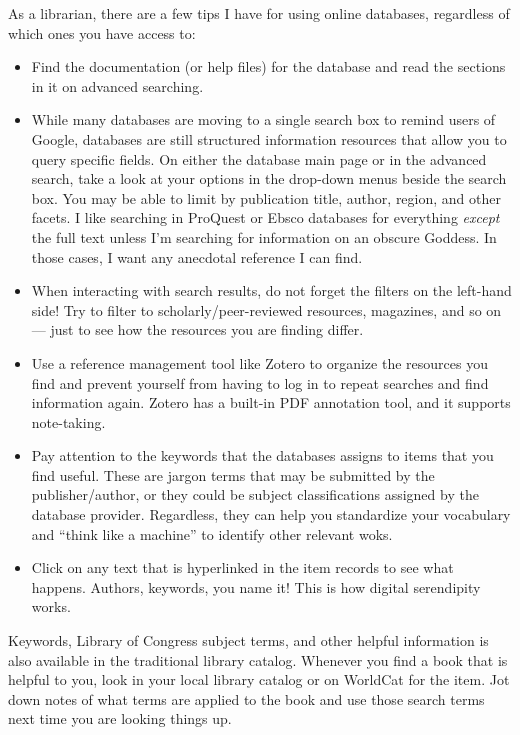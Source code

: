 \documentclass[
]{book}
\providecommand{\tightlist}{%
  \setlength{\itemsep}{0pt}\setlength{\parskip}{0pt}}
\begin{document}
As a librarian, there are a few tips I have for using online databases, regardless of which ones you have access to:

\begin{itemize}
\tightlist
\item
  Find the documentation (or help files) for the database and read the sections in it on advanced searching.
\item
  While many databases are moving to a single search box to remind users of Google, databases are still structured information resources that allow you to query specific fields. On either the database main page or in the advanced search, take a look at your options in the drop-down menus beside the search box. You may be able to limit by publication title, author, region, and other facets. I like searching in ProQuest or Ebsco databases for everything \emph{except} the full text unless I'm searching for information on an obscure Goddess. In those cases, I want any anecdotal reference I can find.
\item
  When interacting with search results, do not forget the filters on the left-hand side! Try to filter to scholarly/peer-reviewed resources, magazines, and so on --- just to see how the resources you are finding differ.
\item
  Use a reference management tool like Zotero to organize the resources you find and prevent yourself from having to log in to repeat searches and find information again. Zotero has a built-in PDF annotation tool, and it supports note-taking.
\item
  Pay attention to the keywords that the databases assigns to items that you find useful. These are jargon terms that may be submitted by the publisher/author, or they could be subject classifications assigned by the database provider. Regardless, they can help you standardize your vocabulary and ``think like a machine'' to identify other relevant woks.
\item
  Click on any text that is hyperlinked in the item records to see what happens. Authors, keywords, you name it! This is how digital serendipity works.
\end{itemize}

Keywords, Library of Congress subject terms, and other helpful information is also available in the traditional library catalog. Whenever you find a book that is helpful to you, look in your local library catalog or on WorldCat for the item. Jot down notes of what terms are applied to the book and use those search terms next time you are looking things up.
\end{document}
